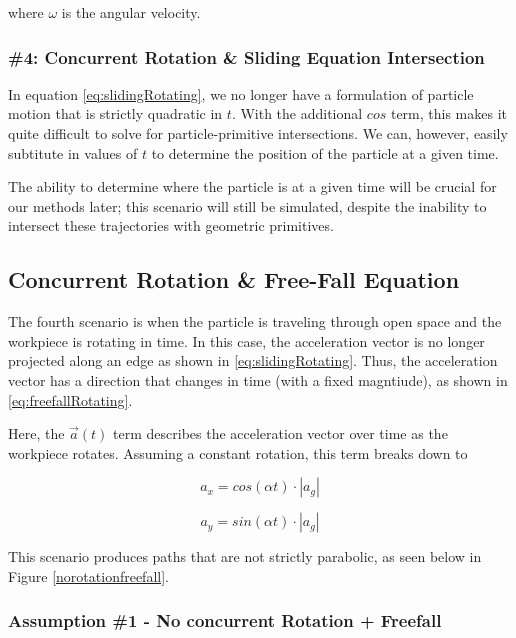 where $\omega$ is the angular velocity.

		\subsubsection{\#4: Concurrent Rotation \& Sliding Equation Intersection}

In equation \eqref{eq:slidingRotating}, we no longer have a formulation of particle motion that is strictly quadratic in $t$. With the additional $cos$ term, this makes it quite difficult to solve for particle-primitive intersections. We can, however, easily subtitute in values of $t$ to determine the position of the particle at a given time.

The ability to determine where the particle is at a given time will be crucial for our methods later; this scenario will still be simulated, despite the inability to intersect these trajectories with geometric primitives.

		\subsection{Concurrent Rotation \& Free-Fall Equation}

The fourth scenario is when the particle is traveling through open space and the workpiece is rotating in time. In this case, the acceleration vector is no longer projected along an edge as shown in \eqref{eq:slidingRotating}. Thus, the acceleration vector has a direction that changes in time (with a fixed magntiude), as shown in \eqref{eq:freefallRotating}.

 {
	\label{eq:freefallRotating}
}

Here, the $\vec{a}(t)$ term describes the acceleration vector over time as the workpiece rotates. Assuming a constant rotation, this term breaks down to

$$
a_x = cos(\alpha t) \cdot |a_g|
$$

$$
a_y = sin(\alpha t) \cdot |a_g|
$$

This scenario produces paths that are not strictly parabolic, as seen below in Figure \ref{norotationfreefall}.


		\subsubsection{Assumption \#1 - No concurrent Rotation + Freefall}

